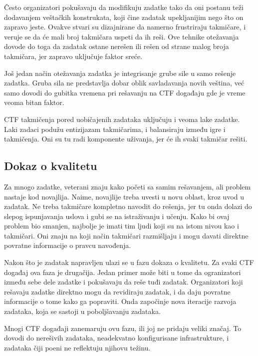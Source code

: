 \documentclass[12pt, a4paper, twocolumn]{article}
\begin{document}
Često organizatori pokušavaju da modifikuju zadatke tako da oni postanu teži
dodavanjem veštačkih konstrukata, koji čine zadatak upekljanijim nego
što on zapravo jeste. Ovakve stvari su dizajnirane da namerno frustriraju
takmičare, i veruje se da će mali broj takmičara uspeti da ih reši.
Ove tehnike otežavanja dovode do toga da zadatak ostane nerešen ili rešen
od strane malog broja takmičara, jer zapravo uključuje faktor sreće. 

Još jedan način otežavanja zadatka je integrisanje grube sile u samo rešenje
zadatka. Gruba sila ne predstavlja dobar oblik savladavanja novih veština,
već samo dovodi do gubitka vremena pri rešavanju na CTF događaju gde je 
vreme veoma bitan faktor.

CTF takmičenja pored uobičajenih zadataka uključuju i veoma lake zadatke.
Laki zadaci podužu entizijazam takmičarima, i balansiraju između igre i 
takmičenja. Oni su tu radi komponente uživanja, jer će ih svaki takmičar 
rešiti.

\subsection{Dokaz o kvalitetu}

Za mnogo zadatke, veterani znaju kako početi sa samim rešavanjem, ali
problem nastaje kod novajlija. Naime, novajlije treba uvesti u novu oblast,
kroz uvod u zadatak. Ne treba takmičare kompletno navodit do rešenja, jer tu 
onda dolazi do slepog ispunjavanja uslova i gubi se na istraživanju i učenju.
Kako bi ovaj problem bio smanjen, najbolje je imati tim ljudi koji su na
istom nivou kao i takmičari. Oni znaju na koji način takmičari razmišljaju
i mogu davati direktne povratne informacije o pravcu navođenja. 

Nakon što je zadatak napravljen ulazi se u fazu dokaza o kvalitetu. Za
svaki CTF događaj ova faza je drugačija. Jedan primer može biti u tome
da ogranizatori između sebe dele zadatke i pokušavaju da reše tuđi zadatak.
Organizatori koji rešavaju zadatke direktno mogu da revidiraju zadatak, i
da daju povratne informacije o tome kako ga popraviti. Onda započinje nova
iteracije razvoja zadataka, koja se sastoji u poboljšavanju zadataka.

Mnogi CTF događaji zanemaruju ovu fazu, ili joj ne pridaju veliki značaj.
To dovodi do nerešivih zadataka, neadekvatno konfigurisane infrastrukture,
i zadataka čiji poeni ne reflektuju njihovu težinu.
\end{document}
